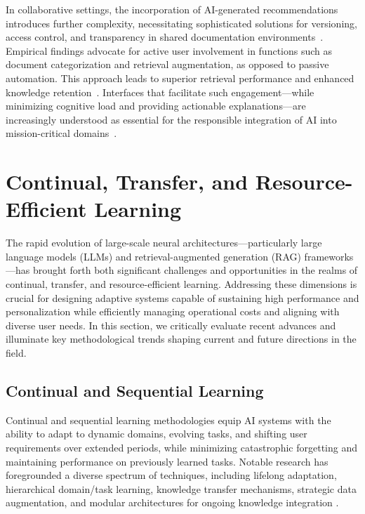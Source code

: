 In collaborative settings, the incorporation of AI-generated recommendations introduces further complexity, necessitating sophisticated solutions for versioning, access control, and transparency in shared documentation environments~\cite{ref52,ref53,ref54}. Empirical findings advocate for active user involvement in functions such as document categorization and retrieval augmentation, as opposed to passive automation. This approach leads to superior retrieval performance and enhanced knowledge retention~\cite{ref54,ref55}. Interfaces that facilitate such engagement---while minimizing cognitive load and providing actionable explanations---are increasingly understood as essential for the responsible integration of AI into mission-critical domains~\cite{ref50,ref63,ref64}.

\section{Continual, Transfer, and Resource-Efficient Learning}

The rapid evolution of large-scale neural architectures—particularly large language models (LLMs) and retrieval-augmented generation (RAG) frameworks—has brought forth both significant challenges and opportunities in the realms of continual, transfer, and resource-efficient learning. Addressing these dimensions is crucial for designing adaptive systems capable of sustaining high performance and personalization while efficiently managing operational costs and aligning with diverse user needs. In this section, we critically evaluate recent advances and illuminate key methodological trends shaping current and future directions in the field.

\subsection{Continual and Sequential Learning}

Continual and sequential learning methodologies equip AI systems with the ability to adapt to dynamic domains, evolving tasks, and shifting user requirements over extended periods, while minimizing catastrophic forgetting and maintaining performance on previously learned tasks. Notable research has foregrounded a diverse spectrum of techniques, including lifelong adaptation, hierarchical domain/task learning, knowledge transfer mechanisms, strategic data augmentation, and modular architectures for ongoing knowledge integration \cite{ref7,ref18,ref19,ref20,ref21,ref22,ref23,ref24,ref26,ref29,ref30,ref46,ref54,ref55,ref61,ref62,ref64}.

